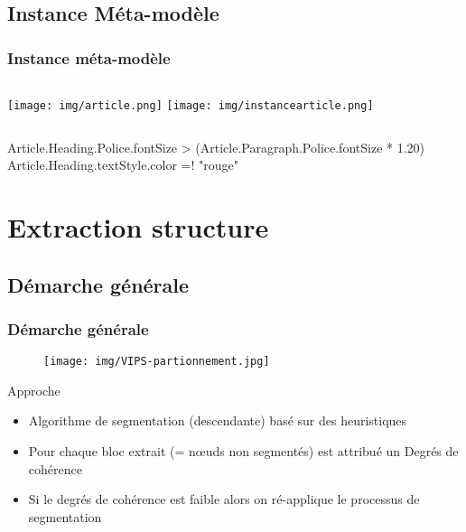 \documentclass[]{beamer}
\begin{document}
\subsection{Instance Méta-modèle}
\begin{frame}
\frametitle{Instance méta-modèle}
    \begin{columns}[c] %
     \texttt{[image: img/article.png]}
     \texttt{[image: img/instancearticle.png]}
    \end{columns}
    \begin{block}{}
    Article.Heading.Police.fontSize > (Article.Paragraph.Police.fontSize * 1.20)
    Article.Heading.textStyle.color =! "rouge"
	\end{block}
\end{frame}
\section{Extraction structure}

\begin{frame}
\tableofcontents[currentsection]
\end{frame}
\subsection{Démarche générale}
\begin{frame}
\frametitle{Démarche générale}
\begin{figure}
\centering
\texttt{[image: img/VIPS-partionnement.jpg]}
\end{figure}
\begin{block}{Approche}
      \begin{itemize}
      	\item Algorithme de segmentation (descendante) basé sur des heuristiques
      	\item Pour chaque bloc extrait (= nœuds non segmentés) est attribué un Degrés de cohérence
      	\item Si le degrés de cohérence est faible alors on ré-applique le processus de segmentation
      \end{itemize}
\end{block}
\end{frame}
\end{document}
